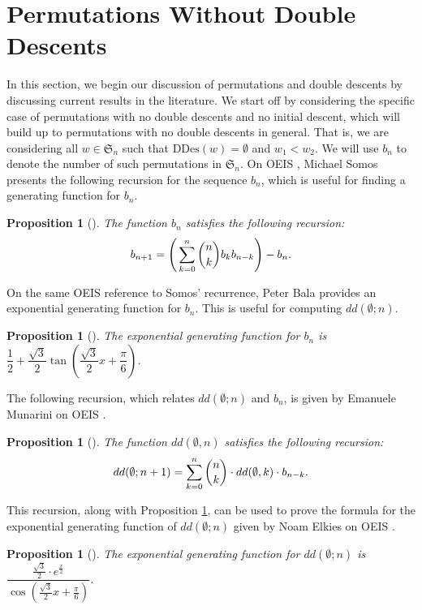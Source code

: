 \documentclass[11pt, a4paper, reqno]{article}
\numberwithin{equation}{section}
\newcommand{\ds}{\displaystyle}
\newtheorem{proposition}[theorem]{Proposition}
\theoremstyle{definition}
\begin{document}
	\section{Permutations Without Double Descents}\label{woddes}
	
	 In this section, we begin our discussion of permutations and double descents by discussing current results in the literature. We start off by considering the specific case of permutations with no double descents and no initial descent, which will build up to permutations with no double descents in general. That is, we are considering all $w \in \mathfrak{S}_n$ such that $\text{DDes}(w) = \emptyset$ and $w_1 < w_2$. We will use $b_n$ to denote the number of such permutations in $\mathfrak{S}_n$. On OEIS \cite{b_n}, Michael Somos presents the following recursion for the sequence $b_n$, which is useful for finding a generating function for $b_n$. 
	\begin{proposition}[\cite{somos}]\label{2.1}
		 The function $b_n$ satisfies the following recursion: $$b_{n+1} = \ds \Bigg(\sum_{k=0}^n\dbinom{n}{k}b_kb_{n-k}\Bigg) - b_n.$$
	\end{proposition}

	On the same OEIS reference to Somos' recurrence, Peter Bala provides an  exponential generating function for $b_n$. This is useful for computing $dd(\emptyset; n)$.
	
	\begin{proposition}[\cite{bala}]\label{2.2}
		The exponential generating function for $b_n$ is $\dfrac{1}{2} + \dfrac{\sqrt{3}}{2}\tan\left(\dfrac{\sqrt{3}}{2}x + \dfrac{\pi}{6}\right)$.
	\end{proposition}
	
	The following recursion, which relates $dd(\emptyset; n)$ and $b_n$, is given by Emanuele Munarini on OEIS \cite{a(n)}.
	
	\begin{proposition}[\cite{munarini}]
		The function $dd(\emptyset, n)$ satisfies the following recursion: $$dd(\emptyset; n+1) = \ds\sum_{k=0}^n\dbinom{n}{k}\cdot dd(\emptyset, k)\cdot b_{n-k}.$$
	\end{proposition}

	This recursion, along with Proposition \ref{2.2}, can be used to prove the formula for the exponential generating function of $dd(\emptyset; n)$ given by Noam Elkies on OEIS \cite{a(n)}.
	
	\begin{proposition}[\cite{elkies}]
		The exponential generating function for $dd(\emptyset; n)$ is $\dfrac{\frac{\sqrt{3}}{2}\cdot e^{\frac{x}{2}}}{\cos\left(\frac{\sqrt{3}}{2}x + \frac{\pi}{6}\right)}$.
	\end{proposition}
\end{document}
